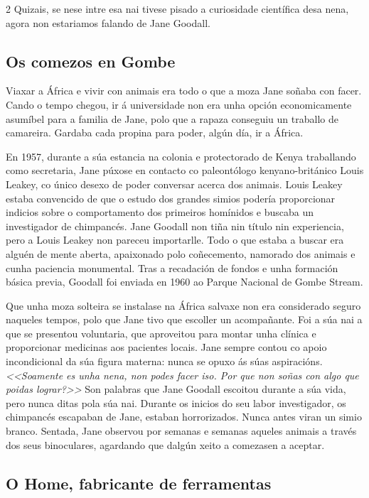 \begin{multicols}{2}
Quizais, se nese intre esa nai tivese pisado a curiosidade científica
desa nena, agora non estariamos falando de Jane Goodall.

\subsection*{Os comezos en Gombe}

Viaxar a África e vivir con animais era todo o que a moza Jane soñaba con
facer. Cando o tempo chegou, ir á universidade non era unha opción
economicamente asumíbel para a familia de Jane, polo que a rapaza conseguiu un
traballo de camareira. Gardaba cada propina para poder, algún día, ir a África.

En 1957, durante a súa estancia na colonia e protectorado de Kenya traballando
como secretaria, Jane púxose en contacto co paleontólogo kenyano-británico
Louis Leakey, co único desexo de poder conversar acerca dos animais. Louis
Leakey estaba convencido de que o estudo dos grandes simios podería
proporcionar indicios sobre o comportamento dos primeiros homínidos e buscaba
un investigador de chimpancés. Jane Goodall non tiña nin título nin
experiencia, pero a Louis Leakey non pareceu importarlle. Todo o que estaba a
buscar era alguén de mente aberta, apaixonado polo coñecemento, namorado dos
animais e cunha paciencia monumental. Tras a recadación de fondos e unha
formación básica previa, Goodall foi enviada en 1960 ao Parque Nacional de
Gombe Stream.

Que unha moza solteira se instalase na África salvaxe non era considerado
seguro naqueles tempos, polo que Jane tivo que escoller un acompañante. Foi a
súa nai a que se presentou voluntaria, que aproveitou para montar unha clínica
e proporcionar medicinas aos pacientes locais. Jane sempre contou co apoio
incondicional da súa figura materna: nunca se opuxo ás súas
aspiracións. \textit{<<Soamente es unha nena, non podes facer iso. Por que non
soñas con algo que poidas lograr?>>} Son palabras que Jane Goodall escoitou
durante a súa vida, pero nunca ditas pola súa nai. Durante os inicios do seu
labor investigador, os chimpancés escapaban de Jane, estaban horrorizados.
Nunca antes viran un simio branco. Sentada, Jane observou por semanas e semanas
aqueles animais a través dos seus binoculares, agardando que dalgún xeito a
comezasen a aceptar.

\subsection*{O Home, fabricante de ferramentas}


\end{multicols}
